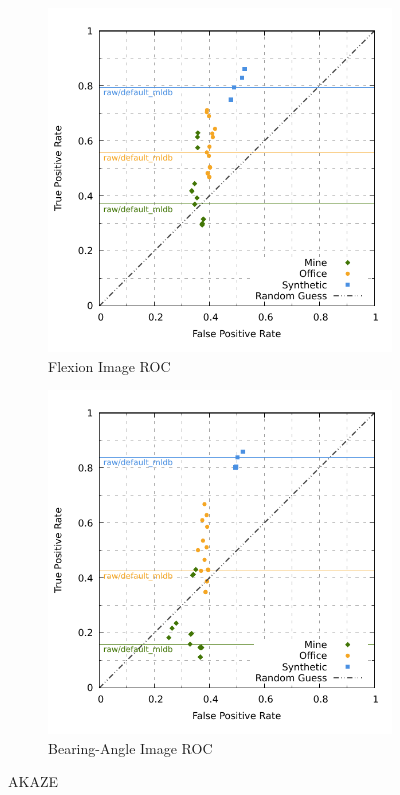 \begin{figure}[H]
\begin{subfigure}[t]{0.45\linewidth}
    \includegraphics[width=\linewidth]{chapter06/results/AKAZE/flexion/roc.pdf}%
    \caption{Flexion Image ROC}
\end{subfigure}\quad
\begin{subfigure}[t]{0.45\linewidth}
    \includegraphics[width=\linewidth]{chapter06/results/AKAZE/bearing/roc.pdf}
    \caption{Bearing-Angle Image ROC}
\end{subfigure}
    \caption{AKAZE}
\end{figure}

